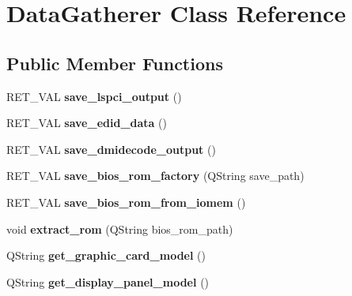 \hypertarget{classDataGatherer}{\section{Data\-Gatherer Class Reference}
\label{classDataGatherer}
}
\subsection*{Public Member Functions}
\begin{DoxyCompactItemize}
\item 
\hypertarget{classDataGatherer_a77ded74272e1c80715106081e12b67fb}{R\-E\-T\-\_\-\-V\-A\-L {\bfseries save\-\_\-lspci\-\_\-output} ()}\label{classDataGatherer_a77ded74272e1c80715106081e12b67fb}

\item 
\hypertarget{classDataGatherer_a8ea3c1580b848d09da73fc4422043e0d}{R\-E\-T\-\_\-\-V\-A\-L {\bfseries save\-\_\-edid\-\_\-data} ()}\label{classDataGatherer_a8ea3c1580b848d09da73fc4422043e0d}

\item 
\hypertarget{classDataGatherer_a0f20eb5811ca910ba418bcab7439a99f}{R\-E\-T\-\_\-\-V\-A\-L {\bfseries save\-\_\-dmidecode\-\_\-output} ()}\label{classDataGatherer_a0f20eb5811ca910ba418bcab7439a99f}

\item 
\hypertarget{classDataGatherer_a2183a8a06988a7bcd95170d94d961f85}{R\-E\-T\-\_\-\-V\-A\-L {\bfseries save\-\_\-bios\-\_\-rom\-\_\-factory} (Q\-String save\-\_\-path)}\label{classDataGatherer_a2183a8a06988a7bcd95170d94d961f85}

\item 
\hypertarget{classDataGatherer_a7f6d3d2669450f279064694798912358}{R\-E\-T\-\_\-\-V\-A\-L {\bfseries save\-\_\-bios\-\_\-rom\-\_\-from\-\_\-iomem} ()}\label{classDataGatherer_a7f6d3d2669450f279064694798912358}

\item 
\hypertarget{classDataGatherer_abefb282ecb13454e87779fafe51bfe74}{void {\bfseries extract\-\_\-rom} (Q\-String bios\-\_\-rom\-\_\-path)}\label{classDataGatherer_abefb282ecb13454e87779fafe51bfe74}

\item 
\hypertarget{classDataGatherer_afb8ae017608db79de193dca247b15fc3}{Q\-String {\bfseries get\-\_\-graphic\-\_\-card\-\_\-model} ()}\label{classDataGatherer_afb8ae017608db79de193dca247b15fc3}

\item 
\hypertarget{classDataGatherer_a3e4f5ea1610739e09b433daadc537e3e}{Q\-String {\bfseries get\-\_\-display\-\_\-panel\-\_\-model} ()}\label{classDataGatherer_a3e4f5ea1610739e09b433daadc537e3e}


\end{DoxyCompactItemize}
